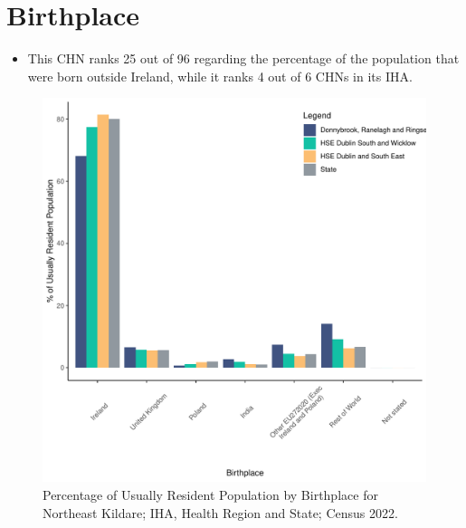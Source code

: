 \documentclass{article}
\begin{document}
\section{Birthplace}\label{sect:Birth}
\begin{itemize}
\item This CHN ranks  25 out of 96 regarding the percentage of the population that were born outside Ireland, while it ranks  4 out of 6 CHNs in its IHA.
\end{itemize}
\begin{figure}[H]
	\centering
	\includegraphics[width = 130mm]{../figures/BirthED.pdf}
	\caption{Percentage of Usually Resident Population by Birthplace for Northeast Kildare; IHA, Health Region and State; Census 2022.}
	\label{fig:vbnv}
	\end{figure}
	
\end{document}
